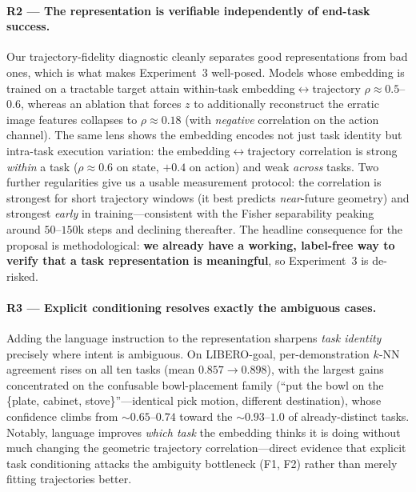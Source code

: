 \paragraph{R2 --- The representation is verifiable independently of end-task
success.} Our trajectory-fidelity diagnostic cleanly separates good
representations from bad ones, which is what makes Experiment~3 well-posed.
Models whose embedding is trained on a tractable target attain within-task
embedding$\leftrightarrow$trajectory $\rho \approx 0.5$--$0.6$, whereas an
ablation that forces $z$ to additionally reconstruct the erratic image features
collapses to $\rho \approx 0.18$ (with \emph{negative} correlation on the action
channel). The same lens shows the embedding encodes not just task identity but
intra-task execution variation: the embedding$\leftrightarrow$trajectory
correlation is strong \emph{within} a task ($\rho \approx 0.6$ on state,
$+0.4$ on action) and weak \emph{across} tasks. Two further regularities give us
a usable measurement protocol: the correlation is strongest for short trajectory
windows (it best predicts \emph{near}-future geometry) and strongest
\emph{early} in training---consistent with the Fisher separability peaking around
$50$--$150$k steps and declining thereafter. The headline consequence for the
proposal is methodological: \textbf{we already have a working, label-free way to
verify that a task representation is meaningful}, so Experiment~3 is de-risked.

\paragraph{R3 --- Explicit conditioning resolves exactly the ambiguous cases.}
Adding the language instruction to the representation sharpens \emph{task
identity} precisely where intent is ambiguous. On LIBERO-goal, per-demonstration
$k$-NN agreement rises on all ten tasks (mean $0.857 \to 0.898$), with the
largest gains concentrated on the confusable bowl-placement family
(``put the bowl on the \{plate, cabinet, stove\}''---identical pick motion,
different destination), whose confidence climbs from $\sim\!0.65$--$0.74$ toward
the $\sim\!0.93$--$1.0$ of already-distinct tasks. Notably, language improves
\emph{which task} the embedding thinks it is doing without much changing the
geometric trajectory correlation---direct evidence that explicit task
conditioning attacks the ambiguity bottleneck (F1, F2) rather than merely
fitting trajectories better.

